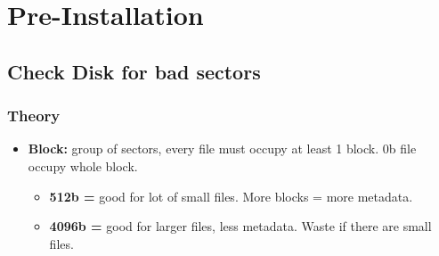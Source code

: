 \documentclass[10pt, a4paper, onecolumn, openany]{book} %
\begin{document}
\chapter{Pre-Installation}
\section{Check Disk for bad sectors}
\subsection{Theory}
\begin{itemize}
    \item \textbf{Block:} group of sectors, every file must occupy at least 1 block. 0b file occupy whole block.
    \begin{itemize}
        \item \textbf{512b =} good for lot of small files. More blocks = more metadata.
        \item \textbf{4096b =}  good for larger files, less metadata. Waste if there are small files.
    \end{itemize}
\end{itemize}
\end{document}
